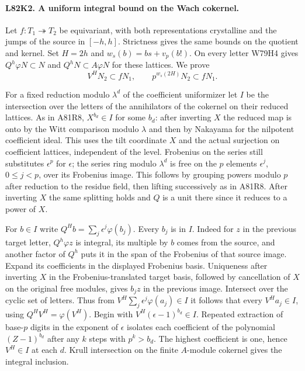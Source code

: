 \paragraph{L82K2. A uniform integral bound on the Wach cokernel.}
Let $f:T_1\twoheadrightarrow T_2$ be equivariant, with both
representations crystalline and the jumps of the source in
$[-h,h]$. Strictness gives the same bounds on the quotient
and kernel. Set $H=2h$ and $w_s(b)=bs+v_p(b!)$.
On every letter W79H4 gives $Q^h\varphi N\subset N$ and
$Q^hN\subset A\varphi N$ for these lattices. We prove
\[
               V^H N_2\subset fN_1,\qquad
               p^{w_s(2H)}N_2\subset fN_1 .
\]

For a fixed reduction modulo $\lambda^d$ of the coefficient
uniformizer let $I$ be the intersection over the letters of
the annihilators of the cokernel on their reduced lattices.
As in A81R8, $X^{b_d}\in I$ for some $b_d$: after inverting
$X$ the reduced map is onto by the Witt comparison modulo
$\lambda$ and then by Nakayama for the nilpotent coefficient
ideal. This uses the tilt coordinate $X$ and the actual
surjection on coefficient lattices, independent of the level.
Frobenius on the series still substitutes $\epsilon^p$ for
$\epsilon$; the series ring modulo $\lambda^d$ is free on the
$p$ elements $\epsilon^j$, $0\le j<p$, over its Frobenius
image. This follows by grouping powers modulo $p$ after reduction
to the residue field, then lifting successively as in A81R8.
After inverting $X$ the same splitting holds and $Q$ is a unit
there since it reduces to a power of $X$.

For $b\in I$ write $Q^H b=\sum_j\epsilon^j\varphi(b_j)$.
Every $b_j$ is in $I$. Indeed for $z$ in the previous target
letter, $Q^h\varphi z$ is integral, its multiple by $b$ comes
from the source, and another factor of $Q^h$ puts it in the
span of the Frobenius of that source image. Expand its coefficients
in the displayed Frobenius basis. Uniqueness after inverting $X$
in the Frobenius-translated target basis, followed by cancellation
of $X$ on the original free modules, gives $b_j z$ in the
previous image. Intersect over the cyclic set of letters.
Thus from $V^H\sum_j\epsilon^j\varphi(a_j)\in I$ it follows
that every $V^Ha_j\in I$, using $Q^HV^H=\varphi(V^H)$.
Begin with $V^H(\epsilon-1)^{b_d}\in I$. Repeated extraction of
base-$p$ digits in the exponent of $\epsilon$ isolates each
coefficient of the polynomial $(Z-1)^{b_d}$ after any $k$ steps
with $p^k>b_d$. The highest coefficient is one, hence $V^H\in I$
at each $d$. Krull intersection on the finite $A$-module cokernel
gives the integral inclusion.

